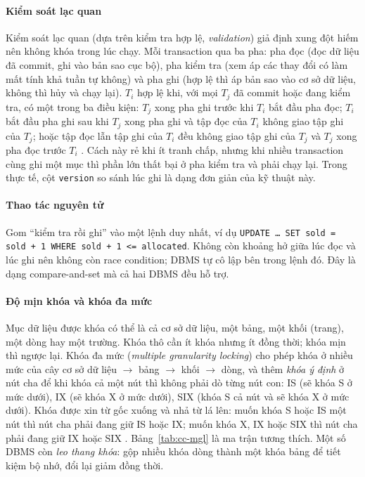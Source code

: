 \paragraph{Kiểm soát lạc quan}
Kiểm soát lạc quan (dựa trên kiểm tra hợp lệ, \emph{validation}) giả định xung đột hiếm nên không khóa trong lúc chạy. Mỗi transaction qua ba pha: pha đọc (đọc dữ liệu đã commit, ghi vào bản sao cục bộ), pha kiểm tra (xem áp các thay đổi có làm mất tính khả tuần tự không) và pha ghi (hợp lệ thì áp bản sao vào cơ sở dữ liệu, không thì hủy và chạy lại). $T_i$ hợp lệ khi, với mọi $T_j$ đã commit hoặc đang kiểm tra, có một trong ba điều kiện: $T_j$ xong pha ghi trước khi $T_i$ bắt đầu pha đọc; $T_i$ bắt đầu pha ghi sau khi $T_j$ xong pha ghi và tập đọc của $T_i$ không giao tập ghi của $T_j$; hoặc tập đọc lẫn tập ghi của $T_i$ đều không giao tập ghi của $T_j$ và $T_j$ xong pha đọc trước $T_i$ \cite{cc-elmasri2016}. Cách này rẻ khi ít tranh chấp, nhưng khi nhiều transaction cùng ghi một mục thì phần lớn thất bại ở pha kiểm tra và phải chạy lại. Trong thực tế, cột \texttt{version} so sánh lúc ghi là dạng đơn giản của kỹ thuật này.

\paragraph{Thao tác nguyên tử}
Gom ``kiểm tra rồi ghi'' vào một lệnh duy nhất, ví dụ \texttt{UPDATE \ldots{} SET sold = sold + 1 WHERE sold + 1 <= allocated}. Không còn khoảng hở giữa lúc đọc và lúc ghi nên không còn race condition; DBMS tự cô lập bên trong lệnh đó. Đây là dạng compare-and-set mà cả hai DBMS đều hỗ trợ.

\paragraph{Độ mịn khóa và khóa đa mức}
Mục dữ liệu được khóa có thể là cả cơ sở dữ liệu, một bảng, một khối (trang), một dòng hay một trường. Khóa thô cần ít khóa nhưng ít đồng thời; khóa mịn thì ngược lại. Khóa đa mức (\emph{multiple granularity locking}) cho phép khóa ở nhiều mức của cây cơ sở dữ liệu $\rightarrow$ bảng $\rightarrow$ khối $\rightarrow$ dòng, và thêm \emph{khóa ý định} ở nút cha để khi khóa cả một nút thì không phải dò từng nút con: IS (sẽ khóa S ở mức dưới), IX (sẽ khóa X ở mức dưới), SIX (khóa S cả nút và sẽ khóa X ở mức dưới). Khóa được xin từ gốc xuống và nhả từ lá lên: muốn khóa S hoặc IS một nút thì nút cha phải đang giữ IS hoặc IX; muốn khóa X, IX hoặc SIX thì nút cha phải đang giữ IX hoặc SIX \cite{cc-silberschatz2019}. Bảng~\ref{tab:cc-mgl} là ma trận tương thích. Một số DBMS còn \emph{leo thang khóa}: gộp nhiều khóa dòng thành một khóa bảng để tiết kiệm bộ nhớ, đổi lại giảm đồng thời.

